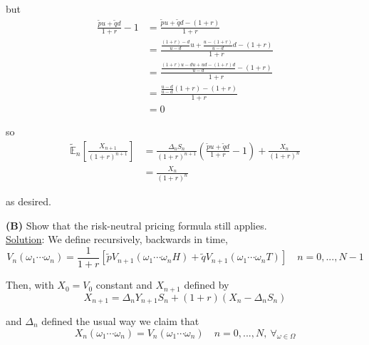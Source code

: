 \documentclass[12pt]{article}
\newcommand{\E}{\mathbb E}
\begin{document}
\begin{enumerate}[(i)]
	but
	\begin{align*}
		\frac{\tilde{p}u + \tilde{q}d}{1 + r} - 1 &= \frac{\tilde{p}u + \tilde{q}d - (1 + r)}{1 + r} \\
		&= \frac{\frac{(1 + r) - d}{u - d}u + \frac{u - (1 + r)}{u - d}d - (1 + r)}{1 + r} \\
		&= \frac{\frac{(1 + r)u - du + ud - (1 + r)d}{u - d} - (1 + r)}{1 + r} \\
		&= \frac{ \frac{u - d}{u - d}(1 + r) - (1 + r)}{1 + r} \\
		&= 0
	\end{align*}
	
	so
	\begin{align*}
		\tilde{\E}_n \left[ \frac{X_{n + 1}}{(1 + r)^{n + 1}} \right] &= \frac{\Delta_nS_n}{(1 + r)^{n + 1}} \left( \frac{\tilde{p}u + \tilde{q}d}{1 + r} - 1 \right) + \frac{X_n}{(1 + r)^n} \\
		&= \frac{X_n}{(1 + r)^n}
	\end{align*}
	
	as desired.
\end{enumerate}

{\bf (B)} Show that the risk-neutral pricing formula still applies. \\

\underline{Solution}: We define recursively, backwards in time,
\begin{equation*}
	V_n(\omega_1\cdots\omega_n) = \frac{1}{1 + r}[\tilde{p}V_{n + 1}(\omega_1\cdots\omega_n H) + \tilde{q}V_{n + 1}(\omega_1\cdots\omega_n T)] \quad n = 0,...,N - 1
\end{equation*}

Then, with $X_0 = V_0$ constant and $X_{n + 1}$ defined by 
\begin{equation*}
	X_{n + 1} = \Delta_nY_{n + 1}S_n + (1 + r)(X_n - \Delta_nS_n)
\end{equation*}

and $\Delta_n$ defined the usual way we claim that
\begin{equation*}
	X_n(\omega_1\cdots\omega_n) = V_n(\omega_1\cdots\omega_n) \quad n = 0, ..., N,~ \forall_{\omega \in \Omega}
\end{equation*}
\end{document}
